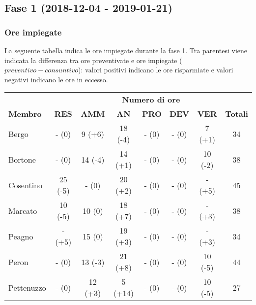 \subsection{Fase 1 (2018-12-04 - 2019-01-21)}
	\subsubsection{Ore impiegate}
		La seguente tabella indica le ore impiegate durante la fase 1. Tra parentesi viene indicata la differenza tra ore preventivate e ore impiegate ($preventivo - consuntivo$): valori positivi indicano le ore risparmiate e valori negativi indicano le ore in eccesso.
		\begin{tabular}{| l | c c c c c c | c |}
			\rowcolor{LightBlue}
			& \multicolumn{7}{c}{\textbf{\color{white}Numero di ore}}	\\
	
			\rowcolor{LightBlue}
			\textbf{\color{white}Membro}
			& \textbf{\color{white}RES}
			& \textbf{\color{white}AMM}
			& \textbf{\color{white}AN}
			& \textbf{\color{white}PRO}
			& \textbf{\color{white}DEV}
			& \textbf{\color{white}VER}
			& \textbf{\color{white}Totali}\\
	
			Bergo     		& -  (0)		& 9  (+6) 	& 18 (-4) 		& - (0) & - (0) & 7  (+1) 	& 34\\
			Bortone   		& -  (0)		& 14 (-4) 	& 14 (+1) 		& - (0) & - (0) & 10 (-2)	& 38\\
			Cosentino 		& 25 (-5) 	& -  (0) 	& 20 (+2) 		& - (0) & - (0) & -  (+5)	& 45\\
			Marcato   		& 10 (-5) 	& 10 (0) 	& 18 (+7) 		& - (0) & - (0) & -  (+3)	& 38\\
			Peagno    		& -  (+5) 	& 15 (0) 	& 19 (+3) 		& - (0) & - (0) & -  (+3)	& 34\\
			Peron     		& -  (0)		& 13 (-3) 	& 21 (+8) 		& - (0) & - (0) & 10 (-5)	& 44\\
			Pettenuzzo 	& - (0) 		& 12 (+3) 	& 5  (+14) 	& - (0) & - (0) & 10 (-5)	& 27\\ \hline
		\end{tabular}

